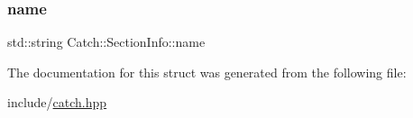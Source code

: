 \subsubsection{\texorpdfstring{name}{name}}
{\footnotesize\ttfamily std\+::string Catch\+::\+Section\+Info\+::name}



The documentation for this struct was generated from the following file\+:\begin{DoxyCompactItemize}
\item 
include/\mbox{\hyperlink{catch_8hpp}{catch.\+hpp}}\end{DoxyCompactItemize}
